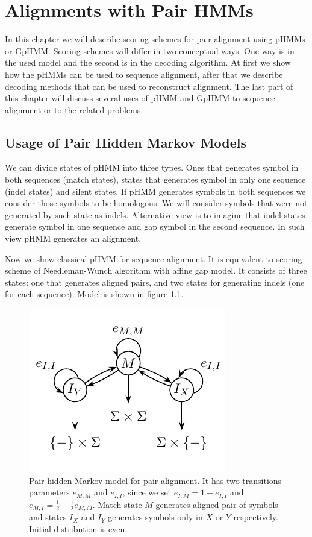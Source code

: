 \chapter{Alignments with Pair HMMs}\label{CHAPTER:PAIRHMM}

In this chapter we will describe scoring schemes for pair alignment using pHMMs
or GpHMM. Scoring schemes will differ in two conceptual ways. One way is in the
used model and the second is in the decoding algorithm. At first we show how the
pHMMs can be used to sequence alignment, after that we describe decoding methods
that can be used to reconstruct alignment. The last part of this chapter will
discuss several uses of pHMM and GpHMM to sequence alignment or to the related
problems.

\section{Usage of Pair Hidden Markov Models}\label{SECTION:SIMPLEPHMM}

We can divide states of pHMM into three types.  Ones that generates symbol in
both sequences (match states), states that generates symbol in only one sequence
(indel states) and silent
states. If pHMM generates  symbols in both sequences we consider those symbols
to be homologous. We will consider symbols that were not generated by such state
as indels. Alternative view is to imagine that indel states generate symbol in
one sequence and gap symbol in the second sequence. In such view pHMM generates
an alignment.

Now we show classical pHMM for sequence alignment. It is equivalent to scoring
scheme of Needleman-Wunch algorithm with affine gap model. It consists of three
states: one that generates aligned pairs, and two states for generating
indels (one for each sequence). Model is shown in figure \ref{FIGURE:SIMPLEPHMM}. 

\begin{figure}
\begin{center}
\includegraphics{../figures/pairHMM.pdf}
\end{center}
\caption[Simple pair HMM model for alignment]{Pair hidden Markov model for pair alignment. It has two transitions
parameters $e_{M,M}$ and $e_{I,I}$, since we set $e_{I,M} = 1 - e_{I,I}$ and
$e_{M,I}=\frac12-\frac12e_{M,M}$. Match state $M$ generates aligned pair of symbols
and states $I_X$ and $I_Y$ generates symbols only in $X$ or $Y$ respectively.
Initial distribution is even.
}\label{FIGURE:SIMPLEPHMM}
\end{figure}

